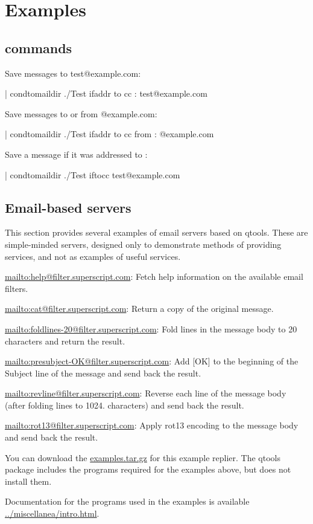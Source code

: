 
\chapter{Examples}
\label{examples}


\section{ commands}
Save messages to test@example.com:
\begin{code}
  | condtomaildir ./Test ifaddr to cc : test@example.com
\end{code}

Save messages to or from @example.com:
\begin{code}
  | condtomaildir ./Test ifaddr to cc from : @example.com
\end{code}

Save a message if it was addressed to :
\begin{code}
  | condtomaildir ./Test iftocc test@example.com
\end{code}

\section{Email-based servers}
This section provides several examples of email servers based on qtools.
These are simple-minded servers, designed only to demonstrate methods
of providing services, and not as examples of useful services.

\href{help}{mailto:help@filter.superscript.com}: Fetch help information on the available email filters.

\href{cat}{mailto:cat@filter.superscript.com}: Return a copy of the original message.

\href{foldlines-20}{mailto:foldlines-20@filter.superscript.com}:
    Fold lines in the message body to 20 characters and return the result.

\href{presubject-OK}{mailto:presubject-OK@filter.superscript.com}:
    Add [OK] to the beginning of the Subject line of the message
    and send back the result.

\href{revline}{mailto:revline@filter.superscript.com}: Reverse each line of the message body (after folding lines to 1024.
    characters) and send back the result.

\href{rot13}{mailto:rot13@filter.superscript.com}: Apply rot13 encoding to the message body and send back the result.

You can download the \href{scripts}{examples.tar.gz} for this example
replier.  The qtools package includes the programs required for the
examples above, but does not install them.

Documentation for the programs used in the examples is available
\href{here}{../miscellanea/intro.html}.


